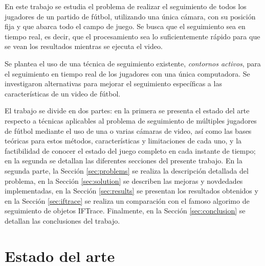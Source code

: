 \documentclass[a4paper,11pt]{report}
\begin{document}
En este trabajo se estudia el problema de realizar el seguimiento de todos los
jugadores de un partido de fútbol, utilizando una única cámara, con su posición
fija y que abarca todo el campo de juego. Se busca que el seguimiento sea en
tiempo real, es decir, que el procesamiento sea lo suficientemente rápido para
que se vean los resultados mientras se ejecuta el video.

Se plantea el uso de una técnica de seguimiento existente, \textit{contornos
activos}, para el seguimiento en tiempo real de los jugadores con una única
computadora. Se investigaron alternativas para mejorar el seguimiento
específicas a las características de un video de fútbol.

El trabajo se divide en dos partes: en la primera se presenta el estado del arte respecto a
técnicas aplicables al problema de seguimiento de múltiples jugadores de fútbol
mediante el uso de una o varias cámaras de video, así como las bases teóricas
para estos métodos, características y limitaciones de cada uno, y la
factibilidad de conocer el estado del juego completo en cada instante de
tiempo; en la segunda se detallan las diferentes secciones
del presente trabajo. En la segunda parte, la Sección \ref{sec:problems} se realiza la descripción detallada del problema, en la Sección
\ref{sec:solution} se describen las mejoras y novdedades implementadas, en la Sección \ref{sec:results} se presentan los resultados obtenidos y en
la Sección \ref{sec:iftrace} se realiza un comparación con el famoso algorimo de seguimiento de objetos IFTrace. Finalmente, en la Sección
\ref{sec:conclusion} se detallan las conclusiones del trabajo.


\newpage

\chapter{Estado del arte}



\newpage










\end{document}
